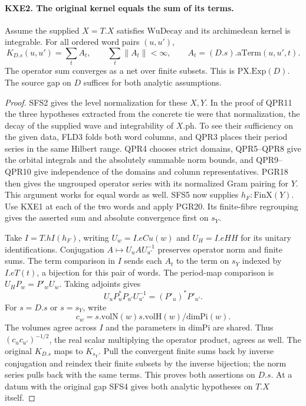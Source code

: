 \paragraph{KXE2. The original kernel equals the sum of its terms.}
Assume the supplied $X=T.X$ satisfies $\mathrm{WuDecay}$ and its
archimedean kernel is integrable. For all ordered word pairs $(u,u')$,
\[
 K_{D.s}(u,u')=\sum_t A_t,\qquad
                  \sum_t\|A_t\|<\infty ,
 \qquad A_t=(D.s).\mathrm{aTerm}(u,u',t).
\]
The operator sum converges as a net over finite subsets. This is
$\mathrm{PX.Exp}(D)$. The source gap on $D$ suffices for both
analytic assumptions.
\begin{proof}
SFS2 gives the level normalization for these $X,Y$. In the proof of
QPR11 the three hypotheses extracted from the concrete tie were
that normalization, the decay of the supplied wave and integrability
of $X.\mathrm{ph}$. To see their sufficiency on the given data,
FLD3 folds both word columns, and QPR3 places their period series
in the same Hilbert range. QPR4 chooses strict domains, QPR5--QPR8
give the orbital integrals and the absolutely summable norm bounds,
and QPR9--QPR10 give independence of the domains and column
representatives. PGR18 then gives the ungrouped operator series with
its normalized Gram pairing for $Y$. This argument works for equal
words as well. SFS5 now supplies $h_F:\mathrm{FinX}(Y)$.
Use KXE1 at each of the two words and apply PGR20. Its finite-fibre
regrouping gives the asserted sum and absolute convergence first
on $s_Y$.

Take $I=T.hI(h_F)$, writing $U_w=I.eCu(w)$ and $U_H=I.eHH$
for its unitary identifications. Conjugation
$A\mapsto U_u A U_{u'}^{-1}$ preserves operator norm and finite
sums. The term comparison in $I$ sends each $A_t$ to the term on
$s_Y$ indexed by $I.eT(t)$, a bijection for this pair of words.
The period-map comparison is $U_HP_w=P'_w U_w$. Taking adjoints
gives
\[
 U_u P_u^*P_{u'}U_{u'}^{-1}=(P'_u)^*P'_{u'}.
\]
For $s=D.s$ or $s=s_Y$, write
\[
 c_w=s.\mathrm{volN}(w)s.\mathrm{volH}(w)/\mathrm{dimPi}(w).
\]
The volumes agree across $I$ and the parameters in $\mathrm{dimPi}$
are shared. Thus $(c_uc_{u'})^{-1/2}$, the real scalar multiplying
the operator product, agrees as well. The original $K_{D.s}$ maps
to $K_{s_Y}$. Pull the convergent finite sums back by inverse
conjugation and reindex their finite subsets by the inverse bijection;
the norm series pulls back with the same terms. This proves both
assertions on $D.s$. At a datum with the original gap SFS4 gives
both analytic hypotheses on $T.X$ itself.
\end{proof}

